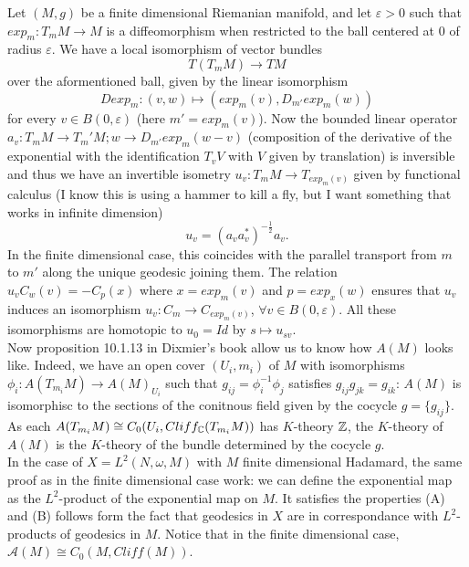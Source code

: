 Let $(M,g)$ be a finite dimensional Riemanian manifold, and let $\varepsilon>0$ such that $exp_m: T_m M \rightarrow M$ is a diffeomorphism when restricted to the ball centered at $0$ of radius $\varepsilon$. We have a local isomorphism of vector bundles
\[T(T_m M)\rightarrow TM\]
over the aformentioned ball, given by the linear isomorphism 
\[Dexp_m : (v,w) \mapsto (exp_m(v) ,  D_{m'} exp_m (w))\] 
for every $v\in B(0,\varepsilon)$ (here $m'= exp_m(v)$). Now the bounded linear operator $a_v :T_m M  \rightarrow T_m' M ; w \rightarrow D_{m'} exp_m (w-v)$ (composition of the derivative of the exponential with the identification $T_v V $ with $V$ given by translation) is inversible and thus we have an invertible isometry $u_v: T_m M \rightarrow T_{exp_m(v)}$ given by functional calculus (I know this is using a hammer to kill a fly, but I want something that works in infinite dimension)
\[u_v = (a_v a_v^*)^{-\frac{1}{2}}a_v.\]
In the finite dimensional case, this coincides with the parallel transport from $m$ to $m'$ along the unique geodesic joining them. The relation $u_v C_w (v) = - C_p(x)$ where $x=exp_m(v)$ and $p=exp_x(w)$ ensures that $u_v$ induces an isomorphism $u_v: C_m \rightarrow C_{exp_m(v)}$, $\forall v\in B(0,\varepsilon)$. All these isomorphisms are homotopic to $u_0 = Id$ by $s\mapsto u_{sv}$. \\

Now proposition 10.1.13 in Dixmier's book \cite{dixmier} allow us to know how $A(M)$ looks like. Indeed, we have an open cover $(U_i,m_i)$ of $M$ with isomorphisms $\phi_i : A(T_{m_i}M) \rightarrow A(M)_{U_i}$ such that $g_{ij}= \phi_i^{-1} \phi_j$ satisfies $g_{ij}g_{jk} = g_{ik}$: $A(M)$ is isomorphisc to the sections of the conitnous field given by the cocycle $g=\{g_{ij}\}$. As each $A(T_{m_i}M) \cong C_0(U_i,Cliff_\mathbb C(T_{m_i}M ))$ has $K$-theory $\mathbb Z$, the $K$-theory of $A(M)$ is the $K$-theory of the bundle determined by the cocycle $g$.\\

In the case of $X=L^2(N,\omega,M)$ with $M$ finite dimensional Hadamard, the same proof as in the finite dimensional case work: we can define the exponential map as the $L^2$-product of the exponential map on $M$. It satisfies the properties (A) and (B) follows form the fact that geodesics in $X$ are in correspondance with $L^2$-products of geodesics in $M$. Notice that in the finite dimensional case, $\mathcal A(M)\cong C_0(M,Cliff(M))$.\\

